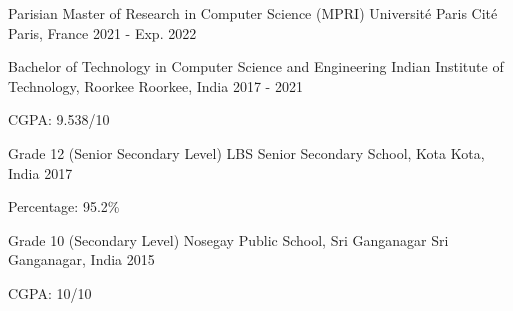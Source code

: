 

\begin{cventries}

  \cventry
    {Parisian Master of Research in Computer Science (MPRI)} %
    {Université Paris Cité} %
    {Paris, France} %
    {2021 - Exp. 2022} %
    {
    }

  \cventry
    {Bachelor of Technology in Computer Science and Engineering} %
    {Indian Institute of Technology, Roorkee} %
    {Roorkee, India} %
    {2017 - 2021} %
    {
      \begin{cvitems} %
        \item {CGPA: 9.538/10}
      \end{cvitems}
    }

  \cventry
    {Grade 12 (Senior Secondary Level)} %
    {LBS Senior Secondary School, Kota} %
    {Kota, India} %
    {2017} %
    {
      \begin{cvitems} %
        \item {Percentage: 95.2\%}
      \end{cvitems}
    }

  \cventry
    {Grade 10 (Secondary Level)} %
    {Nosegay Public School, Sri Ganganagar} %
    {Sri Ganganagar, India} %
    {2015} %
    {
      \begin{cvitems} %
        \item {CGPA: 10/10}
      \end{cvitems}
    }

\end{cventries}
